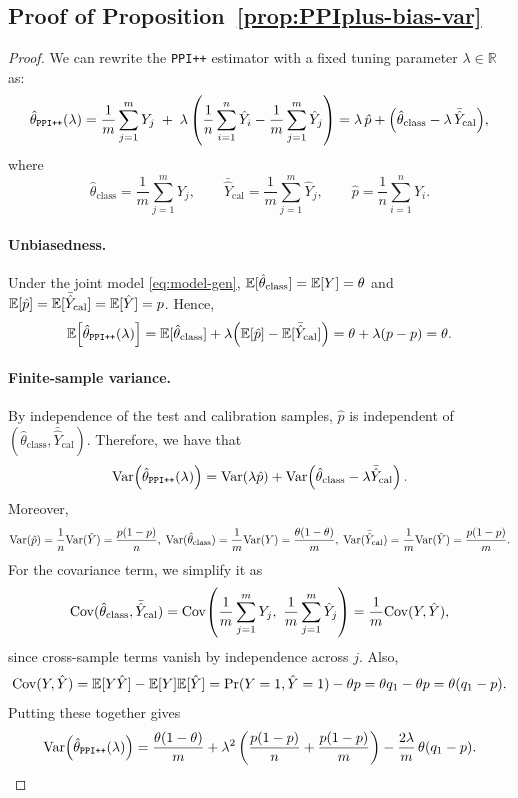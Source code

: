\subsection{Proof of Proposition~\ref{prop:PPIplus-bias-var}}
\begin{proof}
We can rewrite the \texttt{PPI++} estimator with a fixed tuning parameter $\lambda\in\mathbb{R}$ as:
\[
\hat\theta_{\mathrm{\texttt{PPI++}}}(\lambda)
=
\frac{1}{m}\sum_{j=1}^m Y_j
\;+\;
\lambda\left(
\frac{1}{n}\sum_{i=1}^n \hat Y_i
-
\frac{1}{m}\sum_{j=1}^m \hat Y_j
\right)
=
\lambda\,\hat p
+
\Bigl(\hat\theta_{\mathrm{class}}-\lambda\,\bar{\hat Y}_{\mathrm{cal}}\Bigr),
\]
where
\[
\hat\theta_{\mathrm{class}}=\frac{1}{m}\sum_{j=1}^m Y_j,\qquad
\bar{\hat Y}_{\mathrm{cal}}=\frac{1}{m}\sum_{j=1}^m \hat Y_j,\qquad
\hat p=\frac{1}{n}\sum_{i=1}^n \hat Y_i.
\]

\paragraph{Unbiasedness.}
Under the joint model \eqref{eq:model-gen}, $\mathbb{E}[\hat\theta_{\mathrm{class}}]=\mathbb{E}[Y]=\theta$ and
$\mathbb{E}[\hat p]=\mathbb{E}[\bar{\hat Y}_{\mathrm{cal}}]=\mathbb{E}[\hat Y]=p$. Hence,
\[
\mathbb{E}\!\left[\hat\theta_{\mathrm{\texttt{PPI++}}}(\lambda)\right]
=
\mathbb{E}[\hat\theta_{\mathrm{class}}]+\lambda\Bigl(\mathbb{E}[\hat p]-\mathbb{E}[\bar{\hat Y}_{\mathrm{cal}}]\Bigr)
=
\theta+\lambda(p-p)=\theta.
\]

\paragraph{Finite-sample variance.}
By independence of the test and calibration samples, $\hat p$ is independent of
$(\hat\theta_{\mathrm{class}},\bar{\hat Y}_{\mathrm{cal}})$. Therefore, we have that
\[
\mathrm{Var}\!\left(\hat\theta_{\mathrm{\texttt{PPI++}}}(\lambda)\right)
=
\mathrm{Var}(\lambda \hat p)
+
\mathrm{Var}\!\left(\hat\theta_{\mathrm{class}}-\lambda\bar{\hat Y}_{\mathrm{cal}}\right).
\]
Moreover,
\[
\mathrm{Var}(\hat p)=\frac{1}{n}\mathrm{Var}(\hat Y)=\frac{p(1-p)}{n},
\;
\mathrm{Var}(\hat\theta_{\mathrm{class}})=\frac{1}{m}\mathrm{Var}(Y)=\frac{\theta(1-\theta)}{m},
\;
\mathrm{Var}(\bar{\hat Y}_{\mathrm{cal}})=\frac{1}{m}\mathrm{Var}(\hat Y)=\frac{p(1-p)}{m}.
\]
For the covariance term, we simplify it as
\[
\mathrm{Cov}(\hat\theta_{\mathrm{class}},\bar{\hat Y}_{\mathrm{cal}})
=
\mathrm{Cov}\!\left(\frac{1}{m}\sum_{j=1}^m Y_j,\ \frac{1}{m}\sum_{j=1}^m \hat Y_j\right)
=
\frac{1}{m}\mathrm{Cov}(Y,\hat Y),
\]
since cross-sample terms vanish by independence across $j$.
Also,
\[
\mathrm{Cov}(Y,\hat Y)=\mathbb{E}[Y\hat Y]-\mathbb{E}[Y]\mathbb{E}[\hat Y]
=\Pr(Y=1,\hat Y=1)-\theta p
=\theta q_1-\theta p
=\theta(q_1-p).
\]
Putting these together gives
\[
\mathrm{Var}\!\left(\hat\theta_{\mathrm{\texttt{PPI++}}}(\lambda)\right)
=
\frac{\theta(1-\theta)}{m}
+
\lambda^2\left(\frac{p(1-p)}{n}+\frac{p(1-p)}{m}\right)
-
\frac{2\lambda}{m}\,\theta(q_1-p).
\]


\end{proof}
